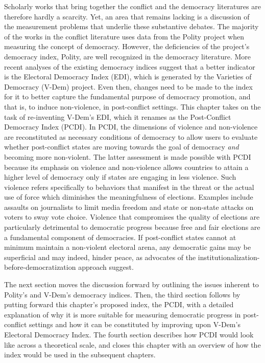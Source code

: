 \documentclass [11pt]{article}
\begin{document}
Scholarly works that bring together the conflict and the democracy literatures are therefore hardly a scarcity. Yet, an area that remains lacking is a discussion of the measurement problems that underlie these substantive debates. The majority of the works in the conflict literature uses data from the Polity project when measuring the concept of democracy. However, the deficiencies of the project's democracy index, Polity, are well recognized in the democracy literature. More recent analyses of the existing democracy indices suggest that a better indicator is the Electoral Democracy Index (EDI), which is generated by the Varieties of Democracy (V-Dem) project. Even then, changes need to be made to the index for it to better capture the fundamental purpose of democracy promotion, and that is, to induce non-violence, in post-conflict settings. This chapter takes on the task of re-inventing V-Dem's EDI, which it renames as the Post-Conflict Democracy Index (PCDI). In PCDI, the dimensions of violence and non-violence are reconstituted as necessary conditions of democracy to allow users to evaluate whether post-conflict states are moving towards the goal of democracy \emph{and} becoming more non-violent. The latter assessment is made possible with PCDI because its emphasis on violence and non-violence allows countries to attain a higher level of democracy only if states are engaging in less violence. Such violence refers specifically to behaviors that manifest in the threat or the actual use of force which diminishes the meaningfulness of elections. Examples include assaults on journalists to limit media freedom and state or non-state attacks on voters to sway vote choice. Violence that compromises the quality of elections are particularly detrimental to democratic progress because free and fair elections are a fundamental component of democracies. If post-conflict states cannot at minimum maintain a non-violent electoral arena, any democratic gains may be superficial and may indeed, hinder peace, as advocates of the institutionalization-before-democratization approach suggest.

The next section moves the discussion forward by outlining the issues inherent to Polity's and V-Dem's democracy indices. Then, the third section follows by putting forward this chapter's proposed index, the PCDI, with a detailed explanation of why it is more suitable for measuring democratic progress in post-conflict settings and how it can be constituted by improving upon V-Dem's Electoral Democracy Index. The fourth section describes how PCDI would look like across a theoretical scale, and closes this chapter with an overview of how the index would be used in the subsequent chapters.
\end{document}
